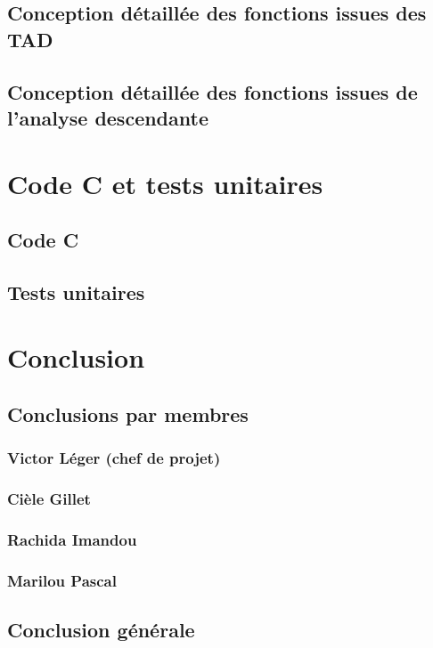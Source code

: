 \documentclass[11pt,a4paper]{article}
\begin{document}
    \subsection{Conception détaillée des fonctions issues des TAD}
    	
    \subsection{Conception détaillée des fonctions issues de l'analyse descendante}
        
\newpage
\section{Code C et tests unitaires}
    
    \subsection{Code C}
       
    \subsection{Tests unitaires}
        
\newpage
\section{Conclusion}
    \subsection{Conclusions par membres}
        \subsubsection{Victor Léger (chef de projet)}
            
        \subsubsection{Cièle Gillet}
            
        \subsubsection{Rachida Imandou}
            
        \subsubsection{Marilou Pascal}
            

    \subsection{Conclusion générale}
        
\end{document}
